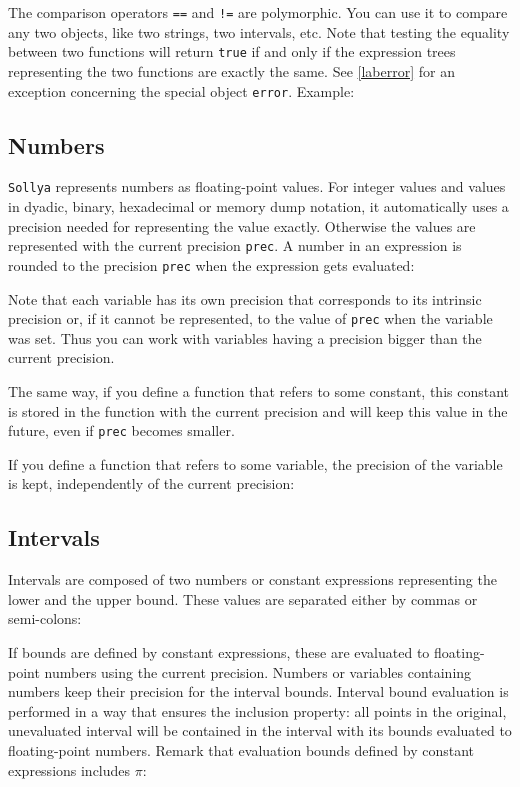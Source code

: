 \documentclass[a4paper]{article}
\newcommand{\com}[1]{\texttt{#1}}
\newcommand{\key}[1]{\texttt{#1}}
\newcommand{\sollya}{\texttt{Sollya}\xspace}
\begin{document}
The comparison operators \key{==} and \key{!=} are polymorphic. You can use it to compare any two objects, like two strings, two intervals, etc. Note that testing the equality between two functions will return \key{true} if and only if the expression trees representing the two functions are exactly the same. See \ref{laberror} for an exception concerning the special object \key{error}. Example:



\subsection{Numbers}
\sollya represents numbers as floating-point values. For integer values and values in dyadic, binary, hexadecimal or memory dump notation, it 
automatically uses a precision needed for representing the value exactly. Otherwise the values are represented with the current precision \com{prec}. A number in an expression is rounded to the precision \com{prec} when the expression gets evaluated:



Note that each variable has its own precision that corresponds to its intrinsic precision or, if it cannot be represented, to the value of \com{prec} when the variable was set. Thus you can work with variables having a precision bigger than the current precision.

The same way, if you define a function that refers to some constant, this constant is stored in the function with the current precision and will keep this value in the future, even if \com{prec} becomes smaller.

If you define a function that refers to some variable, the precision of the variable is kept, independently of the current precision:



\subsection{Intervals}
Intervals are composed of two numbers or constant expressions representing the lower and the upper bound. These values are separated either by commas or semi-colons:



If bounds are defined by constant expressions, these are evaluated to floating-point numbers using the current precision. Numbers or variables containing numbers keep their precision for the interval bounds. Interval bound evaluation is performed in a way that ensures the inclusion property: all points
in the original, unevaluated interval will be contained in the interval with its bounds evaluated to floating-point numbers. Remark that 
evaluation bounds defined by constant expressions includes $\pi$:
\end{document}
